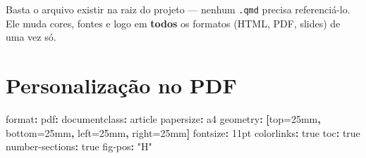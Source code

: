 \documentclass[
  brazilian,
  11pt,
  a4paper,
]{article}
\newenvironment{Shaded}{\begin{snugshade}}{\end{snugshade}}
\newcommand{\AttributeTok}[1]{\textcolor[rgb]{0.40,0.45,0.13}{#1}}
\newcommand{\CharTok}[1]{\textcolor[rgb]{0.13,0.47,0.30}{#1}}
\newcommand{\FunctionTok}[1]{\textcolor[rgb]{0.28,0.35,0.67}{#1}}
\newcommand{\KeywordTok}[1]{\textcolor[rgb]{0.00,0.23,0.31}{\textbf{#1}}}
\newcommand{\StringTok}[1]{\textcolor[rgb]{0.13,0.47,0.30}{#1}}
\begin{document}
\begin{tcolorbox}[enhanced jigsaw, arc=.35mm, bottomrule=.15mm, bottomtitle=1mm, breakable, colback=white, colbacktitle=quarto-callout-note-color!10!white, colframe=quarto-callout-note-color-frame, coltitle=black, left=2mm, leftrule=.75mm, opacityback=0, opacitybacktitle=0.6, rightrule=.15mm, title=\textcolor{quarto-callout-note-color}{\faInfo}\hspace{0.5em}{O que explicar aqui}, titlerule=0mm, toprule=.15mm, toptitle=1mm]

Basta o arquivo existir na raiz do projeto --- nenhum \texttt{.qmd}
precisa referenciá-lo. Ele muda cores, fontes e logo em \textbf{todos}
os formatos (HTML, PDF, slides) de uma vez só.

\end{tcolorbox}

\section{Personalização no PDF}\label{personalizauxe7uxe3o-no-pdf}

\begin{Shaded}
\begin{Highlighting}[]
\FunctionTok{format}\KeywordTok{:}
\AttributeTok{  }\FunctionTok{pdf}\KeywordTok{:}
\AttributeTok{    }\FunctionTok{documentclass}\KeywordTok{:}\AttributeTok{ article}
\AttributeTok{    }\FunctionTok{papersize}\KeywordTok{:}\AttributeTok{ a4}
\AttributeTok{    }\FunctionTok{geometry}\KeywordTok{:}\AttributeTok{ }\KeywordTok{[}\AttributeTok{top=25mm}\KeywordTok{,}\AttributeTok{ bottom=25mm}\KeywordTok{,}\AttributeTok{ left=25mm}\KeywordTok{,}\AttributeTok{ right=25mm}\KeywordTok{]}
\AttributeTok{    }\FunctionTok{fontsize}\KeywordTok{:}\AttributeTok{ 11pt}
\AttributeTok{    }\FunctionTok{colorlinks}\KeywordTok{:}\AttributeTok{ }\CharTok{true}
\AttributeTok{    }\FunctionTok{toc}\KeywordTok{:}\AttributeTok{ }\CharTok{true}
\AttributeTok{    }\FunctionTok{number{-}sections}\KeywordTok{:}\AttributeTok{ }\CharTok{true}
\AttributeTok{    }\FunctionTok{fig{-}pos}\KeywordTok{:}\AttributeTok{ }\StringTok{"H"}
\end{Highlighting}
\end{Shaded}
\end{document}
